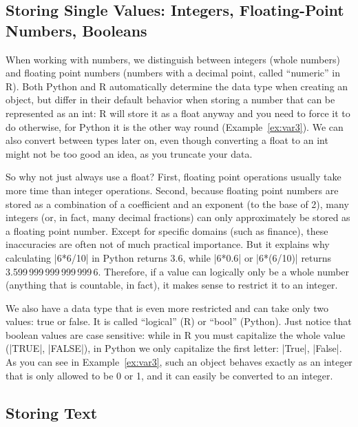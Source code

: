 \subsection{Storing Single Values: Integers, Floating-Point Numbers, Booleans}

 When working with numbers, we distinguish between integers (whole
numbers) and floating point numbers (numbers with a decimal point,
called ``numeric'' in R). Both Python and R automatically determine the
data type when creating an object, but differ in their default
behavior when storing a number that can be represented as an int: R
will store it as a float anyway and you need to force it to do
otherwise, for Python it is the other way round
(Example~\ref{ex:var3}). We can also convert between types later on,
even though converting a float to an int might not be too good an idea,
as you truncate your data.

So why not just always use a float? First,
floating point operations usually take more time than integer operations.
Second, because floating point numbers are stored as a combination of
a coefficient and an exponent (to the base of 2), many integers (or,
in fact, many decimal fractions) can only approximately be stored
as a floating point number. Except for specific domains (such
as finance), these inaccuracies are often not of much practical importance.
But it explains why calculating |6*6/10| in Python returns 3.6, while
|6*0.6| or |6*(6/10)| returns 3.599\,999\,999\,999\,999\,6. Therefore, if
a value can logically only be a whole number (anything that is
countable, in fact), it makes sense to restrict it to an integer.

We also have a data type that is even more restricted and can take
only two values: true or false. It is called ``logical'' (R) or ``bool''
(Python).  Just notice that boolean values are case sensitive:
while in R you must capitalize the whole value (|TRUE|, |FALSE|), in
Python we only capitalize the first letter: |True|, |False|.  As you can
see in Example~\ref{ex:var3}, such an object behaves exactly as an integer that
is only allowed to be 0 or 1, and it can easily be converted to an
integer.





\subsection{Storing Text}

